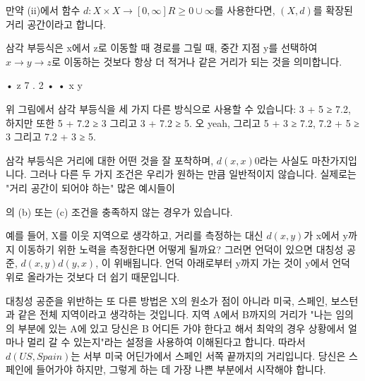 \documentclass[11pt, a4paper, twoside, openany]{book}
\begin{document}
{\par\medskip
만약 (ii)에서 함수 $d : X × X → [0, ∞]  R ≥ 0 ∪{∞}$를 사용한다면, $(X, d)$를 확장된 거리 공간이라고 합니다.

\par\medskip
삼각 부등식은 x\hspace{0pt}에서 z\hspace{0pt}로 이동할 때 경로를 그릴 때, 중간 지점 y\hspace{0pt}를 선택하여 $x → y → z$로 이동하는 것보다 항상 더 적거나 같은 거리가 되는 것을 의미합니다.

\par\medskip
•
z
7 . 2
•
•
x
y

\par\medskip
위 그림에서 삼각 부등식을 세 가지 다른 방식으로 사용할 수 있습니다: 3 + 5 ≥ 7.2, 하지만 또한 5 + 7.2 ≥ 3 그리고 3 + 7.2 ≥ 5. 오 yeah, 그리고 5 + 3 ≥ 7.2, 7.2 + 5 ≥ 3 그리고 7.2 + 3 ≥ 5.

\par\medskip
삼각 부등식은 거리에 대한 어떤 것을 잘 포착하며, $d(x, x)  0$라는 사실도 마찬가지입니다. 그러나 다른 두 가지 조건은 우리가 원하는 만큼 일반적이지 않습니다. 실제로는 "거리 공간이 되어야 하는" 많은 예시들이 
\begin{definitionbox}[정의 2.51]
의 (b) 또는 (c) 조건을 충족하지 않는 경우가 있습니다.
\end{definitionbox}

\par\medskip
예를 들어, X\hspace{0pt}를 이웃 지역으로 생각하고, 거리를 측정하는 대신 $d(x, y)$가 x\hspace{0pt}에서 y\hspace{0pt}까지 이동하기 위한 노력을 측정한다면 어떻게 될까요? 그러면 언덕이 있으면 대칭성 공준, $d(x, y)  d(y, x)$, 이 위배됩니다. 언덕 아래로부터 y\hspace{0pt}까지 가는 것이 y\hspace{0pt}에서 언덕 위로 올라가는 것보다 더 쉽기 때문입니다.

\par\medskip
대칭성 공준을 위반하는 또 다른 방법은 X\hspace{0pt}의 원소가 점이 아니라 미국, 스페인, 보스턴과 같은 전체 지역이라고 생각하는 것입니다. 지역 A\hspace{0pt}에서 B\hspace{0pt}까지의 거리가 "나는 임의의 부분에 있는 A\hspace{0pt}에 있고 당신은 B 어디든 가야 한다고 해서 최악의 경우 상황에서 얼마나 멀리 갈 수 있는지"라는 설정을 사용하여 이해된다고 합니다. 따라서 $d(US, Spain)$는 서부 미국 어딘가에서 스페인 서쪽 끝까지의 거리입니다. 당신은 스페인에 들어가야 하지만, 그렇게 하는 데 가장 나쁜 부분에서 시작해야 합니다.

}
\end{document}

